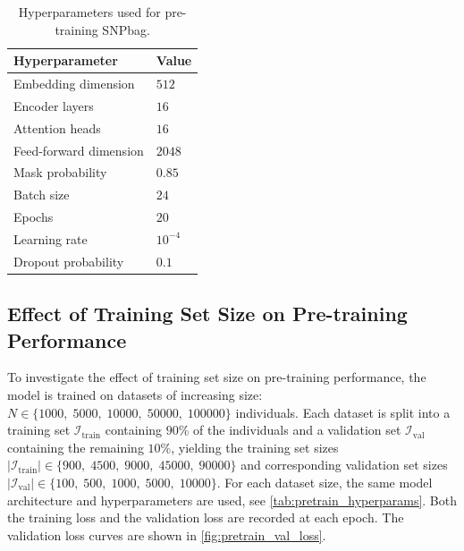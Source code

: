 \begin{table}[h]
\centering
\caption{Hyperparameters used for pre-training SNPbag.}
\label{tab:pretrain_hyperparams}
\begin{tabular}{l l}
\toprule
\textbf{Hyperparameter} & \textbf{Value} \\
\midrule
Embedding dimension          & $512$ \\
Encoder layers               & $16$ \\
Attention heads              & $16$ \\
Feed-forward dimension       & $2048$ \\
Mask probability             & $0.85$ \\
Batch size                   & $24$ \\
Epochs                       & $20$ \\
Learning rate                & $10^{-4}$ \\
Dropout probability                    & $0.1$ \\
\bottomrule
\end{tabular}
\end{table}

\subsection{Effect of Training Set Size on Pre-training Performance}

To investigate the effect of training set size on pre-training performance, the model is trained on datasets of increasing size: $N \in \{1000,\; 5000,\; 10000,\; 50000,\; 100000\}$ individuals. Each dataset is split into a training set $\mathcal{I}_{\mathrm{train}}$ containing $90\%$ of the individuals and a validation set $\mathcal{I}_{\mathrm{val}}$ containing the remaining $10\%$, yielding the training set sizes $|\mathcal{I}_{\mathrm{train}}| \in \{900,\; 4500,\; 9000,\; 45000,\; 90000\}$ and corresponding validation set sizes $|\mathcal{I}_{\mathrm{val}}| \in \{100,\; 500,\; 1000,\; 5000,\; 10000\}$. For each dataset size, the same model architecture and hyperparameters are used, see \autoref{tab:pretrain_hyperparams}. Both the training loss and the validation loss are recorded at each epoch. The validation loss curves are shown in \autoref{fig:pretrain_val_loss}.

